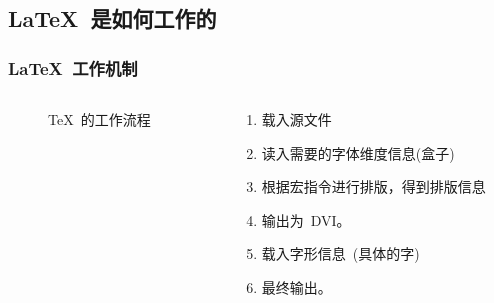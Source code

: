\subsection{\LaTeX~是如何工作的}

\begin{frame}
    \frametitle{\LaTeX~工作机制}
    \begin{columns}
	\begin{column}{6cm}
	\begin{figure}[htb]
	    \begin{center}
	    \end{center}
	    \caption{\TeX~的工作流程}
	    \label{fig:process}
	\end{figure}
	\end{column}
	\begin{column}{4cm}
	    \begin{enumerate}
		\item<2- |alert@2> 载入源文件
		\item<2- |alert@3> 读入需要的字体维度信息(盒子)
		\item<2- |alert@4> 根据宏指令进行排版，得到排版信息
		\item<2- |alert@5> 输出为~DVI。
		\item<2- |alert@6> 载入字形信息~(具体的字)
		\item<2- |alert@7> 最终输出。
	    \end{enumerate}
	\end{column}
    \end{columns}
\end{frame}

